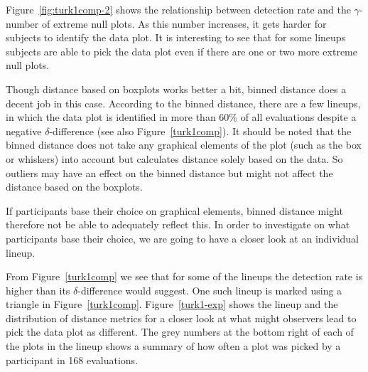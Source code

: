 \documentclass[12pt]{article}\usepackage[]{graphicx}\usepackage[]{color}
\begin{document}
Figure~\ref{fig:turk1comp-2} shows the relationship between detection rate and the $\gamma$-number of extreme null plots. As this number increases, it gets harder for subjects to identify the data plot. It is interesting to see that for some lineups subjects are able to  pick the data plot even if there are  one or two more extreme null plots. 

Though  distance based on  boxplots works better a bit,  binned distance does a decent job in this case. According to the binned distance, there are a few lineups, in which  the data plot is identified in more than 60\% of all evaluations despite a negative $\delta$-difference (see also Figure~\ref{turk1comp}). It should be noted that the binned distance does not take any graphical elements of the plot (such as the box or whiskers) into account but calculates distance solely based on the data. So outliers may have an effect on the binned distance but might not affect the distance based on the boxplots. 

If participants base their choice on graphical elements, binned distance might therefore not be able to adequately reflect this.
In order to investigate on what participants base their choice, we are going to have a closer look at an individual lineup. 

From Figure~\ref{turk1comp} we see that for some of the lineups the detection rate is higher than its $\delta$-difference would suggest. One such lineup is marked using a triangle in Figure~\ref{turk1comp}. %
Figure~\ref{turk1-exp} shows the lineup and the distribution of distance metrics for a closer look at what might observers lead to pick the data plot as different. The grey numbers at the bottom right of each of the plots in the lineup shows a summary of how often a plot was picked by a participant in 168 evaluations.
\end{document}
